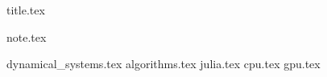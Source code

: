 \documentclass[12pt,a4paper,twoside]{article}
\numberwithin{figure}{section}
\numberwithin{equation}{section}
\theoremstyle{definition}
\theoremstyle{remark}
\theoremstyle{remark}
\begin{document}
{title.tex}

\newpage
\tableofcontents
\vspace*{10ex}

{note.tex}

\newpage

\pagestyle{headings}

{dynamical_systems.tex}
{algorithms.tex}
{julia.tex}
{cpu.tex}
{gpu.tex}

\printbibliography
\end{document}
